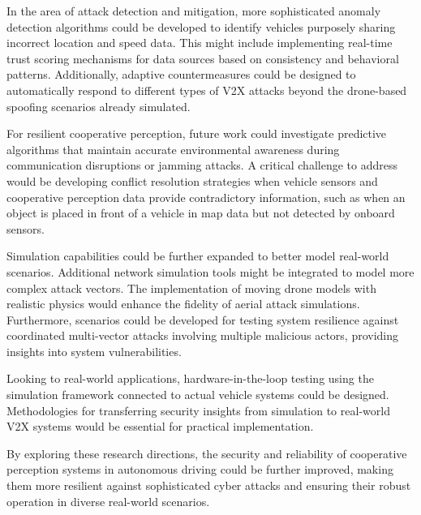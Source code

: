 In the area of attack detection and mitigation, more sophisticated anomaly detection algorithms could be developed to identify vehicles purposely sharing incorrect location and speed data. This might include implementing real-time trust scoring mechanisms for data sources based on consistency and behavioral patterns. Additionally, adaptive countermeasures could be designed to automatically respond to different types of V2X attacks beyond the drone-based spoofing scenarios already simulated.

For resilient cooperative perception, future work could investigate predictive algorithms that maintain accurate environmental awareness during communication disruptions or jamming attacks. A critical challenge to address would be developing conflict resolution strategies when vehicle sensors and cooperative perception data provide contradictory information, such as when an object is placed in front of a vehicle in map data but not detected by onboard sensors.

Simulation capabilities could be further expanded to better model real-world scenarios. Additional network simulation tools might be integrated to model more complex attack vectors. The implementation of moving drone models with realistic physics would enhance the fidelity of aerial attack simulations. Furthermore, scenarios could be developed for testing system resilience against coordinated multi-vector attacks involving multiple malicious actors, providing insights into system vulnerabilities.

Looking to real-world applications, hardware-in-the-loop testing using the simulation framework connected to actual vehicle systems could be designed. Methodologies for transferring security insights from simulation to real-world V2X systems would be essential for practical implementation.

By exploring these research directions, the security and reliability of cooperative perception systems in autonomous driving could be further improved, making them more resilient against sophisticated cyber attacks and ensuring their robust operation in diverse real-world scenarios.